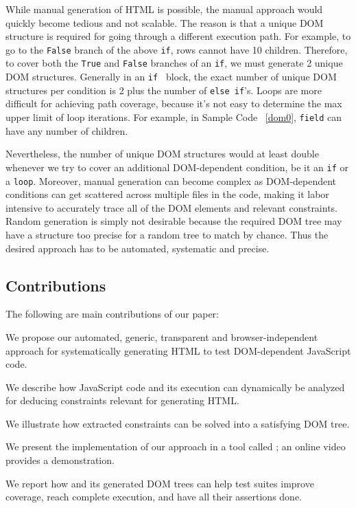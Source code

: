 While manual generation of HTML is possible, the manual approach would quickly become tedious and not scalable.  
The reason is that a unique DOM structure is required for going through a different execution path.
For example, to go to the {\tt False} branch of the above {\tt if}, rows cannot have 10 children.
Therefore, to cover both the {\tt True} and {\tt False} branches of an {\tt if}, we must generate 2 unique DOM structures.  Generally in an {\tt if } block, the exact number of unique DOM structures per condition is 2 plus the number of {\tt else if}'s.  Loops are more difficult for achieving path coverage, because it's not easy to determine the max upper limit of loop iterations.  For example, in Sample Code ~\ref{dom0}, {\tt field} can have any number of children.

Nevertheless, the number of unique DOM structures would at least double whenever we try to cover an additional DOM-dependent condition, be it an {\tt if} or a {\tt loop}.  
Moreover, manual generation can become complex as DOM-dependent conditions can get scattered across multiple files in the code, making it labor intensive to accurately trace all of the DOM elements and relevant constraints.  
Random generation is simply not desirable because the required DOM tree may have a structure too precise for a random tree to match by chance.  
Thus the desired approach has to be automated, systematic and precise.

\subsection{Contributions}
The following are main contributions of our paper:
\begin {compactitem}
\item We propose our automated, generic, transparent and browser-independent approach for systematically generating HTML to test DOM-dependent JavaScript code.
\item We describe how JavaScript code and its execution can dynamically be analyzed for deducing constraints relevant for generating HTML.
\item We illustrate how extracted constraints can be solved into a satisfying DOM tree.
\item We present the implementation of our approach in a tool called \tool; an online video provides a demonstration.
\item We report how \tool and its generated DOM trees can help test suites improve coverage, reach complete execution, and have all their assertions done.
\end {compactitem}

